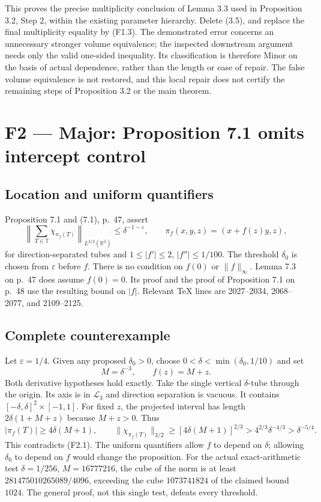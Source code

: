 \documentclass[10pt]{article}
\begin{document}
This proves the precise multiplicity conclusion of Lemma 3.3 used in Proposition 3.2, Step 2, within the existing parameter hierarchy. Delete (3.5), and replace the final multiplicity equality by (F1.3). The demonstrated error concerns an unnecessary stronger volume equivalence; the inspected downstream argument needs only the valid one-sided inequality. Its classification is therefore Minor on the basis of actual dependence, rather than the length or ease of repair. The false volume equivalence is not restored, and this local repair does not certify the remaining steps of Proposition 3.2 or the main theorem.\par
\section*{F2 — Major: Proposition 7.1 omits intercept control}
\subsection*{Location and uniform quantifiers}
Proposition 7.1 and (7.1), p. 47, assert \[\left\|\sum_{T\in\mathbb T}\chi_{\pi_f(T)}\right\|_{L^{3/2}(\mathbb R^2)}
 \le\delta^{-1-\varepsilon},\qquad
 \pi_f(x,y,z)=(x+f(z)y,z),
 \tag{F2.1}\] for direction-separated tubes and \(1\le|f'|\le2\), \(|f''|\le1/100\). The threshold \(\delta_0\) is chosen from \(\varepsilon\) before \(f\). There is no condition on \(f(0)\) or \(\|f\|_\infty\). Lemma 7.3 on p. 47 does assume \(f(0)=0\). Its proof and the proof of Proposition 7.1 on p. 48 use the resulting bound on \(|f|\). Relevant TeX lines are 2027–2034, 2068–2077, and 2109–2125.\par
\subsection*{Complete counterexample}
Let \(\varepsilon=1/4\). Given any proposed \(\delta_0>0\), choose \(0<\delta<\min(\delta_0,1/10)\) and set \[M=\delta^{-3},\qquad f(z)=M+z.\] Both derivative hypotheses hold exactly. Take the single vertical \(\delta\)-tube through the origin. Its axis is in \(\mathcal L_3\) and direction separation is vacuous. It contains \([-\delta,\delta]^2\times[-1,1]\). For fixed \(z\), the projected interval has length \(2\delta(1+M+z)\) because \(M+z>0\). Thus \[|\pi_f(T)|\ge4\delta(M+1),\qquad
 \|\chi_{\pi_f(T)}\|_{3/2}
 \ge[4\delta(M+1)]^{2/3}
 >4^{2/3}\delta^{-4/3}>\delta^{-5/4}.\] This contradicts (F2.1). The uniform quantifiers allow \(f\) to depend on \(\delta\); allowing \(\delta_0\) to depend on \(f\) would change the proposition. For the actual exact-arithmetic test \(\delta=1/256\), \(M=16777216\), the cube of the norm is at least \(281475010265089/4096\), exceeding the cube \(1073741824\) of the claimed bound \(1024\). The general proof, not this single test, defeats every threshold.\par
\end{document}
